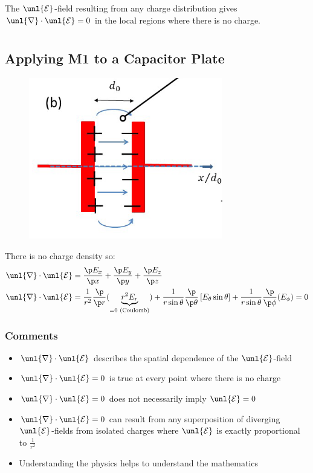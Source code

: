 \documentclass[a4paper, 11pt, normalem]{report}
\renewcommand\E{\mathcal{E}}
\newcommand\uE{\unl{\E}}
\renewcommand\del{\unl{\nabla}}
\begin{document}
The $\uE$-field resulting from any charge distribution gives $\del \cdot \uE = 0$ in the local regions where there is no charge.

\chapter{}
\section{Applying M1 to a Capacitor Plate}
\begin{figure}
    \begin{center}
        \vspace{-20pt}
        \includegraphics[scale=0.4]{cap.png}
        \vspace{-90pt}
    \end{center}
\end{figure}
There is no charge density so:
\begin{align}
    \del\cdot\uE &= \frac{\p E_x}{\p x} + \frac{\p E_y}{\p y} + \frac{\p E_z}{\p z} \\
    \del\cdot\uE &= \frac{1}{r^2}\frac{\p}{\p r}(\underbrace{r^2 E_r}_{= 0\text{ (Coulomb)}}) + \frac{1}{r\sin\theta}\frac{\p}{\p \theta}\left[E_\theta\sin\theta\right] + \frac{1}{r\sin\theta}\frac{\p}{\p \phi}(E_\phi) = 0
\end{align}

\subsection{Comments}
\begin{itemize}
    \item $\del\cdot\uE$ describes the spatial dependence of the $\uE$-field
    \item $\del\cdot\uE = 0$ is true at every point where there is no charge
    \item $\del\cdot\uE = 0$ does not necessarily imply $\uE = 0$
    \item $\del\cdot\uE = 0$ can result from any superposition of diverging $\uE$-fields from isolated charges where $\uE$ is exactly proportional to $\frac{1}{r^2}$
    \item Understanding the physics helps to understand the mathematics
\end{itemize}
\end{document}
